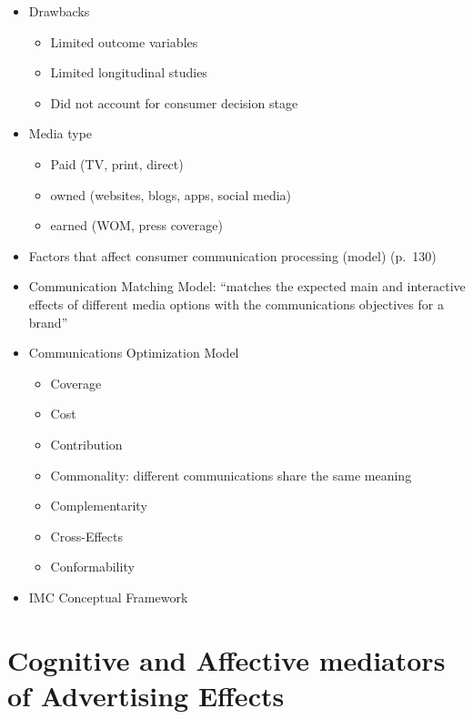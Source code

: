 \documentclass[
]{book}
\begin{document}
\begin{itemize}
  \begin{itemize}
  \item
    Traditional media synergies
  \item
    sales force and personal selling interactions
  \item
    Online and offline synergies
  \end{itemize}
\item
  Drawbacks

  \begin{itemize}
  \item
    Limited outcome variables
  \item
    Limited longitudinal studies
  \item
    Did not account for consumer decision stage
  \end{itemize}
\item
  Media type

  \begin{itemize}
  \item
    Paid (TV, print, direct)
  \item
    owned (websites, blogs, apps, social media)
  \item
    earned (WOM, press coverage)
  \end{itemize}
\item
  Factors that affect consumer communication processing (model) (p.~130)
\item
  Communication Matching Model: ``matches the expected main and interactive effects of different media options with the communications objectives for a brand''
\item
  Communications Optimization Model

  \begin{itemize}
  \item
    Coverage
  \item
    Cost
  \item
    Contribution
  \item
    Commonality: different communications share the same meaning
  \item
    Complementarity
  \item
    Cross-Effects
  \item
    Conformability
  \end{itemize}
\item
  IMC Conceptual Framework
\end{itemize}

\hypertarget{cognitive-and-affective-mediators-of-advertising-effects}{%
\section{Cognitive and Affective mediators of Advertising Effects}\label{cognitive-and-affective-mediators-of-advertising-effects}}
\end{document}
